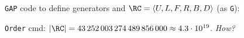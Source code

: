 \begin{slide}
    \texttt{GAP} code to define generators and $\RC = \langle U,L,F,R,B,D \rangle$ (as \texttt{G}):

    {\footnotesize} \pause

    \texttt{Order} cmd: $|\RC| = 43\,252\,003\,274\,489\,856\,000 \approx 4.3 \cdot 10^{19}$. \textit{How?}
\end{slide}











